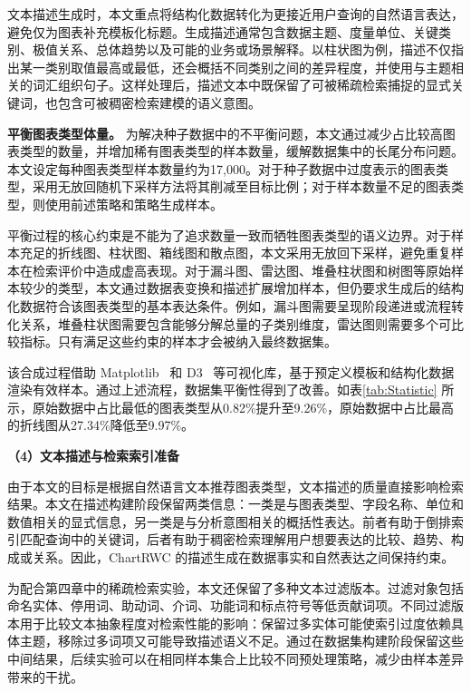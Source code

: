 文本描述生成时，本文重点将结构化数据转化为更接近用户查询的自然语言表达，避免仅为图表补充模板化标题。生成描述通常包含数据主题、度量单位、关键类别、极值关系、总体趋势以及可能的业务或场景解释。以柱状图为例，描述不仅指出某一类别取值最高或最低，还会概括不同类别之间的差异程度，并使用与主题相关的词汇组织句子。这样处理后，描述文本中既保留了可被稀疏检索捕捉的显式关键词，也包含可被稠密检索建模的语义意图。

 \textbf{平衡图表类型体量。}
为解决种子数据中的不平衡问题，本文通过减少占比较高图表类型的数量，并增加稀有图表类型的样本数量，缓解数据集中的长尾分布问题。本文设定每种图表类型样本数量约为17,000。对于种子数据中过度表示的图表类型，采用无放回随机下采样方法将其削减至目标比例；对于样本数量不足的图表类型，则使用前述策略和策略生成样本。

平衡过程的核心约束是不能为了追求数量一致而牺牲图表类型的语义边界。对于样本充足的折线图、柱状图、箱线图和散点图，本文采用无放回下采样，避免重复样本在检索评价中造成虚高表现。对于漏斗图、雷达图、堆叠柱状图和树图等原始样本较少的类型，本文通过数据表变换和描述扩展增加样本，但仍要求生成后的结构化数据符合该图表类型的基本表达条件。例如，漏斗图需要呈现阶段递进或流程转化关系，堆叠柱状图需要包含能够分解总量的子类别维度，雷达图则需要多个可比较指标。只有满足这些约束的样本才会被纳入最终数据集。

该合成过程借助 Matplotlib~\cite{Hunter2007Matplotlib} 和 D3~\cite{bostock2011d3} 等可视化库，基于预定义模板和结构化数据渲染有效样本。通过上述流程，数据集平衡性得到了改善。如表\ref{tab:Statistic} 所示，原始数据中占比最低的图表类型从0.82\%提升至9.26\%，原始数据中占比最高的折线图从27.34\%降低至9.97\%。

\noindent\textbf{（4）文本描述与检索索引准备}

由于本文的目标是根据自然语言文本推荐图表类型，文本描述的质量直接影响检索结果。本文在描述构建阶段保留两类信息：一类是与图表类型、字段名称、单位和数值相关的显式信息，另一类是与分析意图相关的概括性表达。前者有助于倒排索引匹配查询中的关键词，后者有助于稠密检索理解用户想要表达的比较、趋势、构成或关系。因此，ChartRWC 的描述生成在数据事实和自然表达之间保持约束。

为配合第四章中的稀疏检索实验，本文还保留了多种文本过滤版本。过滤对象包括命名实体、停用词、助动词、介词、功能词和标点符号等低贡献词项。不同过滤版本用于比较文本抽象程度对检索性能的影响：保留过多实体可能使索引过度依赖具体主题，移除过多词项又可能导致描述语义不足。通过在数据集构建阶段保留这些中间结果，后续实验可以在相同样本集合上比较不同预处理策略，减少由样本差异带来的干扰。

